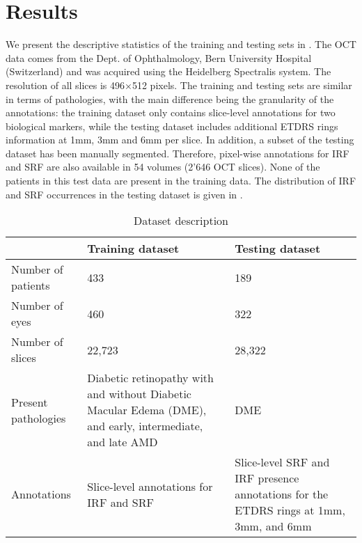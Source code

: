 \section{Results}
\label{sec:oct_results}
We present the descriptive statistics of the training and testing sets in . The OCT data comes from the Dept. of Ophthalmology, Bern University Hospital (Switzerland) and was acquired using the Heidelberg Spectralis system. The resolution of all slices is 496×512 pixels. The training and testing sets are similar in terms of pathologies, with the main difference being  the granularity of the annotations: the training dataset only contains slice-level annotations for two biological markers, while the testing dataset includes additional ETDRS rings information at 1mm, 3mm and 6mm per slice. In addition, a subset of the testing dataset has been manually segmented. Therefore, pixel-wise annotations for IRF and SRF are also available in 54 volumes (2’646 OCT slices). None of the patients in this test data are present in the training data. The distribution of IRF and SRF occurrences in the testing dataset is given in .

\noindent
\begin{table*}[t]
\centering
\caption{Dataset description}
\label{tab:dataset}
\begin{tabular}{p{4cm}p{5.5cm}p{5.5cm}}
\toprule
 & Training dataset & Testing dataset \\ \midrule
Number of patients & 433 & 189 \\
Number of eyes & 460 & 322 \\
Number of slices & 22,723 & 28,322 \\
Present pathologies & Diabetic retinopathy with and without Diabetic Macular Edema (DME), and early, intermediate, and late AMD & DME \\
Annotations & Slice-level annotations for IRF and SRF & Slice-level SRF and IRF presence   annotations for the ETDRS rings at 1mm, 3mm, and 6mm \\ \bottomrule
\end{tabular}

\end{table*}

